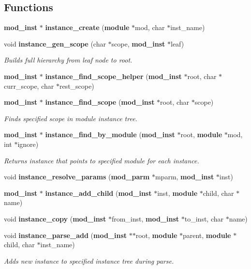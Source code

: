 \subsection*{Functions}
\begin{CompactItemize}
\item 
{\bf mod\_\-inst} $\ast$ {\bf instance\_\-create} ({\bf module} $\ast$mod, char $\ast$inst\_\-name)
\item 
void {\bf instance\_\-gen\_\-scope} (char $\ast$scope, {\bf mod\_\-inst} $\ast$leaf)
\begin{CompactList}\small\item\em Builds full hierarchy from leaf node to root. \item\end{CompactList}\item 
{\bf mod\_\-inst} $\ast$ {\bf instance\_\-find\_\-scope\_\-helper} ({\bf mod\_\-inst} $\ast$root, char $\ast$curr\_\-scope, char $\ast$rest\_\-scope)
\item 
{\bf mod\_\-inst} $\ast$ {\bf instance\_\-find\_\-scope} ({\bf mod\_\-inst} $\ast$root, char $\ast$scope)
\begin{CompactList}\small\item\em Finds specified scope in module instance tree. \item\end{CompactList}\item 
{\bf mod\_\-inst} $\ast$ {\bf instance\_\-find\_\-by\_\-module} ({\bf mod\_\-inst} $\ast$root, {\bf module} $\ast$mod, int $\ast$ignore)
\begin{CompactList}\small\item\em Returns instance that points to specified module for each instance. \item\end{CompactList}\item 
void {\bf instance\_\-resolve\_\-params} ({\bf mod\_\-parm} $\ast$mparm, {\bf mod\_\-inst} $\ast$inst)
\item 
{\bf mod\_\-inst} $\ast$ {\bf instance\_\-add\_\-child} ({\bf mod\_\-inst} $\ast$inst, {\bf module} $\ast$child, char $\ast$name)
\item 
void {\bf instance\_\-copy} ({\bf mod\_\-inst} $\ast$from\_\-inst, {\bf mod\_\-inst} $\ast$to\_\-inst, char $\ast$name)
\item 
void {\bf instance\_\-parse\_\-add} ({\bf mod\_\-inst} $\ast$$\ast$root, {\bf module} $\ast$parent, {\bf module} $\ast$child, char $\ast$inst\_\-name)
\begin{CompactList}\small\item\em Adds new instance to specified instance tree during parse. \item\end{CompactList}\item 
$$
\end{CompactItemize}
